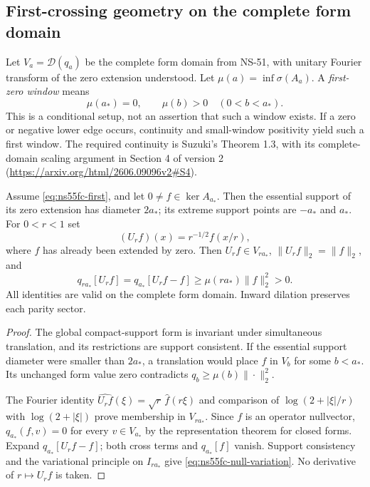 \subsection*{First-crossing geometry on the complete form domain}

Let $V_a=\mathcal D(q_a)$ be the complete form domain from NS-51,
with unitary Fourier transform of the zero extension understood.
Let $\mu(a)=\inf\sigma(A_a)$. A \emph{first-zero window} means
\begin{equation}\label{eq:ns55fc-first}
 \mu(a_*)=0,\qquad \mu(b)>0\quad(0<b<a_*).
\end{equation}
This is a conditional setup, not an assertion that such a window exists.
If a zero or negative lower edge occurs, continuity and small-window
positivity yield such a first window. The required continuity is
Suzuki's Theorem 1.3, with its complete-domain scaling argument in
Section 4 of version 2
(\url{https://arxiv.org/html/2606.09096v2#S4}).

\begin{proposition}
\label{prop:ns55fc-geometry}
Assume \eqref{eq:ns55fc-first}, and let $0\ne f\in\ker A_{a_*}$.
Then the essential support of its zero extension has diameter $2a_*$;
its extreme support points are $-a_*$ and $a_*$. For $0<r<1$ set
\[
 (U_rf)(x)=r^{-1/2}f(x/r),
\]
where $f$ has already been extended by zero. Then $U_rf\in V_{ra_*}$,
$\|U_rf\|_2=\|f\|_2$, and
\begin{equation}\label{eq:ns55fc-null-variation}
 q_{ra_*}[U_rf]
 =q_{a_*}[U_rf-f]
 \ge\mu(ra_*)\|f\|_2^2>0.
\end{equation}
All identities are valid on the complete form domain. Inward dilation
preserves each parity sector.
\end{proposition}
\begin{proof}
The global compact-support form is invariant under simultaneous
translation, and its restrictions are support consistent. If the
essential support diameter were smaller than $2a_*$, a translation
would place $f$ in $V_b$ for some $b<a_*$. Its unchanged form value
zero contradicts $q_b\ge\mu(b)\|\cdot\|_2^2$.

The Fourier identity $\widehat{U_rf}(\xi)=\sqrt r\,\widehat f(r\xi)$
and comparison of $\log(2+|\xi|/r)$ with $\log(2+|\xi|)$ prove
membership in $V_{ra_*}$. Since $f$ is an operator nullvector,
$q_{a_*}(f,v)=0$ for every $v\in V_{a_*}$ by the representation
theorem for closed forms. Expand $q_{a_*}[U_rf-f]$; both cross terms
and $q_{a_*}[f]$ vanish. Support consistency and the variational
principle on $I_{ra_*}$ give \eqref{eq:ns55fc-null-variation}.
No derivative of $r\mapsto U_rf$ is taken.
\end{proof}

